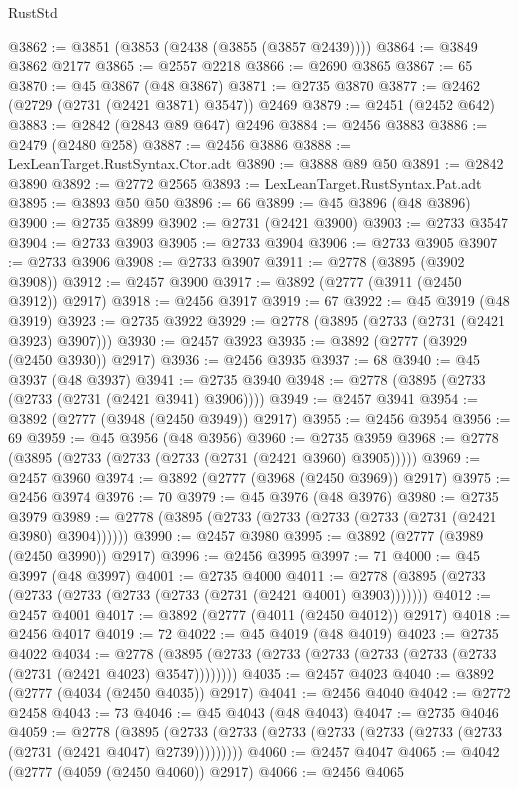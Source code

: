\begin{lexlean}{RustStd}
\begin{coremodule}
@3862 := @3851 (@3853 (@2438 (@3855 (@3857 @2439))))
@3864 := @3849 @3862 @2177
@3865 := @2557 @2218
@3866 := @2690 @3865
@3867 := 65
@3870 := @45 @3867 (@48 @3867)
@3871 := @2735 @3870
@3877 := @2462 (@2729 (@2731 (@2421 @3871) @3547)) @2469
@3879 := @2451 (@2452 @642)
@3883 := @2842 (@2843 @89 @647) @2496
@3884 := @2456 @3883
@3886 := @2479 (@2480 @258)
@3887 := @2456 @3886
@3888 := LexLeanTarget.RustSyntax.Ctor.adt
@3890 := @3888 @89 @50
@3891 := @2842 @3890
@3892 := @2772 @2565
@3893 := LexLeanTarget.RustSyntax.Pat.adt
@3895 := @3893 @50 @50
@3896 := 66
@3899 := @45 @3896 (@48 @3896)
@3900 := @2735 @3899
@3902 := @2731 (@2421 @3900)
@3903 := @2733 @3547
@3904 := @2733 @3903
@3905 := @2733 @3904
@3906 := @2733 @3905
@3907 := @2733 @3906
@3908 := @2733 @3907
@3911 := @2778 (@3895 (@3902 @3908))
@3912 := @2457 @3900
@3917 := @3892 (@2777 (@3911 (@2450 @3912)) @2917)
@3918 := @2456 @3917
@3919 := 67
@3922 := @45 @3919 (@48 @3919)
@3923 := @2735 @3922
@3929 := @2778 (@3895 (@2733 (@2731 (@2421 @3923) @3907)))
@3930 := @2457 @3923
@3935 := @3892 (@2777 (@3929 (@2450 @3930)) @2917)
@3936 := @2456 @3935
@3937 := 68
@3940 := @45 @3937 (@48 @3937)
@3941 := @2735 @3940
@3948 := @2778 (@3895 (@2733 (@2733 (@2731 (@2421 @3941) @3906))))
@3949 := @2457 @3941
@3954 := @3892 (@2777 (@3948 (@2450 @3949)) @2917)
@3955 := @2456 @3954
@3956 := 69
@3959 := @45 @3956 (@48 @3956)
@3960 := @2735 @3959
@3968 := @2778 (@3895 (@2733 (@2733 (@2733 (@2731 (@2421 @3960) @3905)))))
@3969 := @2457 @3960
@3974 := @3892 (@2777 (@3968 (@2450 @3969)) @2917)
@3975 := @2456 @3974
@3976 := 70
@3979 := @45 @3976 (@48 @3976)
@3980 := @2735 @3979
@3989 := @2778 (@3895 (@2733 (@2733 (@2733 (@2733 (@2731 (@2421 @3980) @3904))))))
@3990 := @2457 @3980
@3995 := @3892 (@2777 (@3989 (@2450 @3990)) @2917)
@3996 := @2456 @3995
@3997 := 71
@4000 := @45 @3997 (@48 @3997)
@4001 := @2735 @4000
@4011 := @2778 (@3895 (@2733 (@2733 (@2733 (@2733 (@2733 (@2731 (@2421 @4001) @3903)))))))
@4012 := @2457 @4001
@4017 := @3892 (@2777 (@4011 (@2450 @4012)) @2917)
@4018 := @2456 @4017
@4019 := 72
@4022 := @45 @4019 (@48 @4019)
@4023 := @2735 @4022
@4034 := @2778 (@3895 (@2733 (@2733 (@2733 (@2733 (@2733 (@2733 (@2731 (@2421 @4023) @3547))))))))
@4035 := @2457 @4023
@4040 := @3892 (@2777 (@4034 (@2450 @4035)) @2917)
@4041 := @2456 @4040
@4042 := @2772 @2458
@4043 := 73
@4046 := @45 @4043 (@48 @4043)
@4047 := @2735 @4046
@4059 := @2778
    (@3895 (@2733 (@2733 (@2733 (@2733 (@2733 (@2733 (@2733 (@2731 (@2421 @4047) @2739)))))))))
@4060 := @2457 @4047
@4065 := @4042 (@2777 (@4059 (@2450 @4060)) @2917)
@4066 := @2456 @4065

\end{coremodule}
\end{lexlean}
